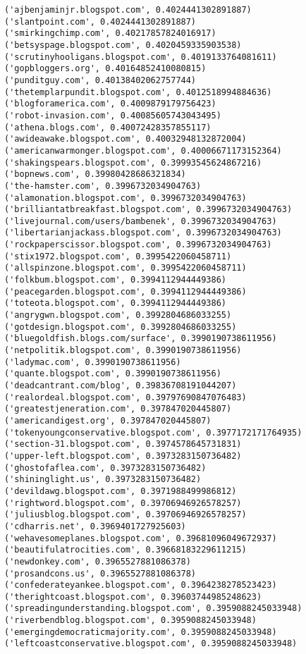 \documentclass[11pt]{article}
\begin{document}
\begin{Verbatim}[commandchars=\\\{\}]
('ajbenjaminjr.blogspot.com', 0.4024441302891887)
('slantpoint.com', 0.4024441302891887)
('smirkingchimp.com', 0.40217857824016917)
('betsyspage.blogspot.com', 0.4020459335903538)
('scrutinyhooligans.blogspot.com', 0.4019133764081611)
('gopbloggers.org', 0.40164852410080815)
('punditguy.com', 0.40138402062757744)
('thetemplarpundit.blogspot.com', 0.4012518994884636)
('blogforamerica.com', 0.4009879179756423)
('robot-invasion.com', 0.40085605743043495)
('athena.blogs.com', 0.40072428357855117)
('awideawake.blogspot.com', 0.40032948132872004)
('americanwarmonger.blogspot.com', 0.40006671173152364)
('shakingspears.blogspot.com', 0.39993545624867216)
('bopnews.com', 0.39980428686321834)
('the-hamster.com', 0.3996732034904763)
('alamonation.blogspot.com', 0.3996732034904763)
('brilliantatbreakfast.blogspot.com', 0.3996732034904763)
('livejournal.com/users/bambenek', 0.3996732034904763)
('libertarianjackass.blogspot.com', 0.3996732034904763)
('rockpaperscissor.blogspot.com', 0.3996732034904763)
('stix1972.blogspot.com', 0.3995422060458711)
('allspinzone.blogspot.com', 0.3995422060458711)
('folkbum.blogspot.com', 0.3994112944449386)
('peacegarden.blogspot.com', 0.3994112944449386)
('toteota.blogspot.com', 0.3994112944449386)
('angrygwn.blogspot.com', 0.3992804686033255)
('gotdesign.blogspot.com', 0.3992804686033255)
('bluegoldfish.blogs.com/surface', 0.3990190738611956)
('netpolitik.blogspot.com', 0.3990190738611956)
('ladymac.com', 0.3990190738611956)
('quante.blogspot.com', 0.3990190738611956)
('deadcantrant.com/blog', 0.39836708191044207)
('realordeal.blogspot.com', 0.39797690847076483)
('greatestjeneration.com', 0.397847020445807)
('americandigest.org', 0.397847020445807)
('tokenyoungconservative.blogspot.com', 0.3977172171764935)
('section-31.blogspot.com', 0.3974578645731831)
('upper-left.blogspot.com', 0.3973283150736482)
('ghostofaflea.com', 0.3973283150736482)
('shininglight.us', 0.3973283150736482)
('devildawg.blogspot.com', 0.3971988499986812)
('rightword.blogspot.com', 0.39706946926578257)
('juliusblog.blogspot.com', 0.39706946926578257)
('cdharris.net', 0.3969401727925603)
('wehavesomeplanes.blogspot.com', 0.39681096049672937)
('beautifulatrocities.com', 0.39668183229611215)
('newdonkey.com', 0.3965527881086378)
('prosandcons.us', 0.3965527881086378)
('confederateyankee.blogspot.com', 0.3964238278523423)
('therightcoast.blogspot.com', 0.39603744985248623)
('spreadingunderstanding.blogspot.com', 0.3959088245033948)
('riverbendblog.blogspot.com', 0.3959088245033948)
('emergingdemocraticmajority.com', 0.3959088245033948)
('leftcoastconservative.blogspot.com', 0.3959088245033948)

\end{Verbatim}
\end{document}
